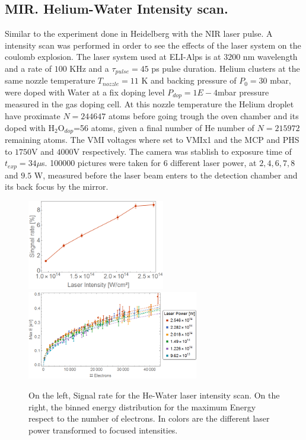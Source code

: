\subsection{MIR. Helium-Water Intensity scan.}

Similar to the experiment done in Heidelberg with the NIR laser pulse. A intensity scan was performed in order to see the effects of the laser system on the coulomb explosion. The laser system used at ELI-Alps is at $3200$ nm wavelength and a rate of $100$ KHz and a $\tau_{pulse}=45$ ps pulse duration. Helium clusters at the same nozzle temperature $T_{nozzle}=11$ K and  backing pressure of $P_{0}=30$ mbar, were doped with Water at a fix doping level $P_{dop}=1E-4$mbar pressure measured in the gas doping cell. At this nozzle temperature the Helium droplet have proximate $N=244647$ atoms before going trough the oven chamber and its doped with H$_{2}$O$_{dop}$=56 atoms, given a final number of He number of $N=215972$ remaining atoms. The VMI voltages where set to VMIx1 and the MCP and PHS to $1750$V and $4000$V respectively. The camera was stablish to exposure time of $t_{exp}=34 \mu$s. 100000 pictures were taken for 6 different laser power, at $2, 4, 6, 7, 8$ and $9.5$ W, measured before the laser beam enters to the detection chamber and its back focus by the mirror. 

\begin{figure}[h!]
\centering

\hspace*{\fill}
{ \includegraphics[width=6cm]{../Images/results/MIR_He_waterIntensityscan/sigRate.png}} \hfill {\includegraphics[width=7.5cm]{../Images/results/MIR_He_waterIntensityscan/binned.png}}
\hspace*{\fill}
\caption[MIR He intensity scan]{On the left, Signal rate for the He-Water laser intensity scan. On the right, the binned energy distribution for the maximum Energy respect to the number of electrons. In colors are the different laser power transformed to focused intensities. }
\label{fig:mult1}
\end{figure}

